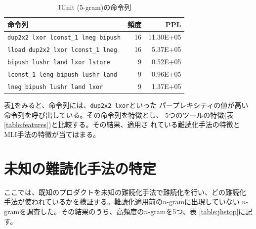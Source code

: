 \documentclass[12pt,twoside]{jreport}
\begin{document}
\begin{table}[t]
  \centering
  \footnotesize{
    \caption{JUnit (5-gram)の命令列}\label{table:junit}
  \begin{tabular}{l|r|r}
    命令列 & 頻度 & PPL\\ \hline
    \texttt{dup2x2 lxor lconst\_1 lneg bipush}   & 16 & 11.30E+05 \\
    \texttt{lload dup2x2 lxor lconst\_1 lneg}    & 16 &   5.37E+05 \\
    \texttt{bipush lushr land lxor lstore}       &  9 &   0.52E+05 \\
    \texttt{lconst\_1 leng bipush lushr land}    &  9 &   0.96E+05 \\
    \texttt{lneg bipush lushr land lxor}         &  9 &  1.37E+05 \\
  \end{tabular}}
\end{table}

表\ref{table:junit}をみると、命令列には、\texttt{dup2x2 lxor}といった
パープレキシティの値が高い命令列を呼び出している。その命令列を特徴とし、
5つのツールの特徴(表\ref{table:features})と比較する。その結果、適用さ
れている難読化手法の特徴とMLI手法の特徴が当てはまる。

\section{未知の難読化手法の特定}

ここでは、既知のプロダクトを未知の難読化手法で難読化を行い、どの難読化
手法が使われているかを検証する。難読化適用前の$n$-gramに出現していない
$n$-gramを調査した。その結果のうち、高頻度の$n$-gramを5つ、表
\ref{table:jhstop}に記す。
\end{document}
